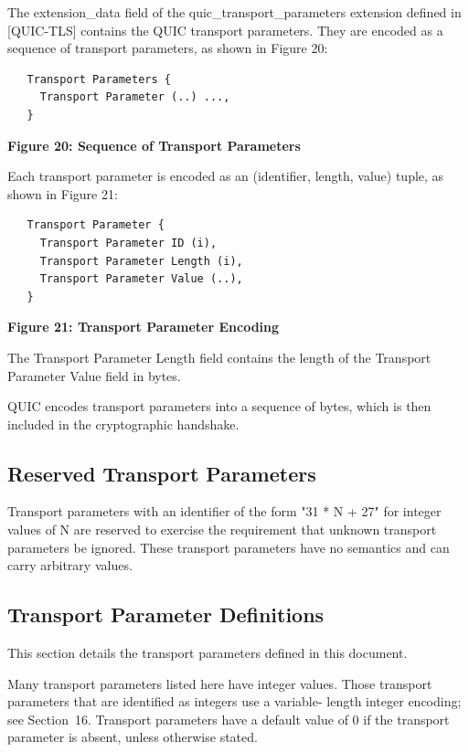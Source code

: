 \documentclass{article}
\begin{document}
The extension\_data field of the quic\_transport\_parameters extension defined in [QUIC-TLS] contains the QUIC transport parameters.  They are encoded as a sequence of transport parameters, as shown in Figure 20:

\begin{verbatim}
   Transport Parameters {
     Transport Parameter (..) ...,
   }
\end{verbatim}

\begin{center}
\textbf{Figure 20: Sequence of Transport Parameters}
\end{center}

Each transport parameter is encoded as an (identifier, length, value) tuple, as shown in Figure 21:

\begin{verbatim}
   Transport Parameter {
     Transport Parameter ID (i),
     Transport Parameter Length (i),
     Transport Parameter Value (..),
   }
\end{verbatim}

\begin{center}
\textbf{Figure 21: Transport Parameter Encoding}
\end{center}

The Transport Parameter Length field contains the length of the Transport Parameter Value field in bytes.

QUIC encodes transport parameters into a sequence of bytes, which is then included in the cryptographic handshake.

\subsection{Reserved Transport Parameters}

Transport parameters with an identifier of the form "31 * N + 27" for integer values of N are reserved to exercise the requirement that unknown transport parameters be ignored.  These transport parameters have no semantics and can carry arbitrary values.

\subsection{Transport Parameter Definitions}

This section details the transport parameters defined in this document.

Many transport parameters listed here have integer values.  Those transport parameters that are identified as integers use a variable- length integer encoding; see Section~16.  Transport parameters have a default value of 0 if the transport parameter is absent, unless otherwise stated.
\end{document}
